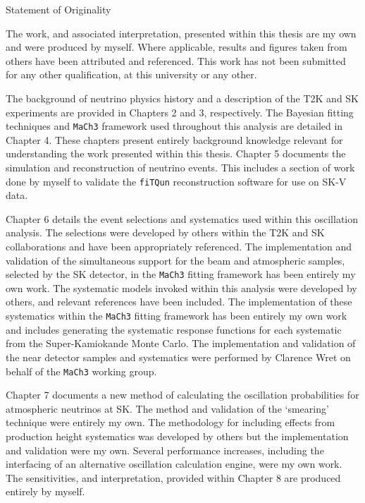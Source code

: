 \begin{center}
  \huge{Statement of Originality}
\end{center}

The work, and associated interpretation, presented within this thesis are my own and were produced by myself. Where applicable, results and figures taken from others have been attributed and referenced. This work has not been submitted for any other qualification, at this university or any other.

The background of neutrino physics history and a description of the T2K and SK experiments are provided in Chapters 2 and 3, respectively. The Bayesian fitting techniques and \texttt{MaCh3} framework used throughout this analysis are detailed in Chapter 4. These chapters present entirely background knowledge relevant for understanding the work presented within this thesis. Chapter 5 documents the simulation and reconstruction of neutrino events. This includes a section of work done by myself to validate the \texttt{fiTQun} reconstruction software for use on SK-V data.

Chapter 6 details the event selections and systematics used within this oscillation analysis. The selections were developed by others within the T2K and SK collaborations and have been appropriately referenced. The implementation and validation of the simultaneous support for the beam and atmospheric samples, selected by the SK detector, in the \texttt{MaCh3} fitting framework has been entirely my own work. The systematic models invoked within this analysis were developed by others, and relevant references have been included. The implementation of these systematics within the \texttt{MaCh3} fitting framework has been entirely my own work and includes generating the systematic response functions for each systematic from the Super-Kamiokande Monte Carlo. The implementation and validation of the near detector samples and systematics were performed by Clarence Wret on behalf of the \texttt{MaCh3} working group.

Chapter 7 documents a new method of calculating the oscillation probabilities for atmospheric neutrinos at SK. The method and validation of the `smearing' technique were entirely my own. The methodology for including effects from production height systematics was developed by others but the implementation and validation were my own. Several performance increases, including the interfacing of an alternative oscillation calculation engine, were my own work. The sensitivities, and interpretation, provided within Chapter 8 are produced entirely by myself. 
